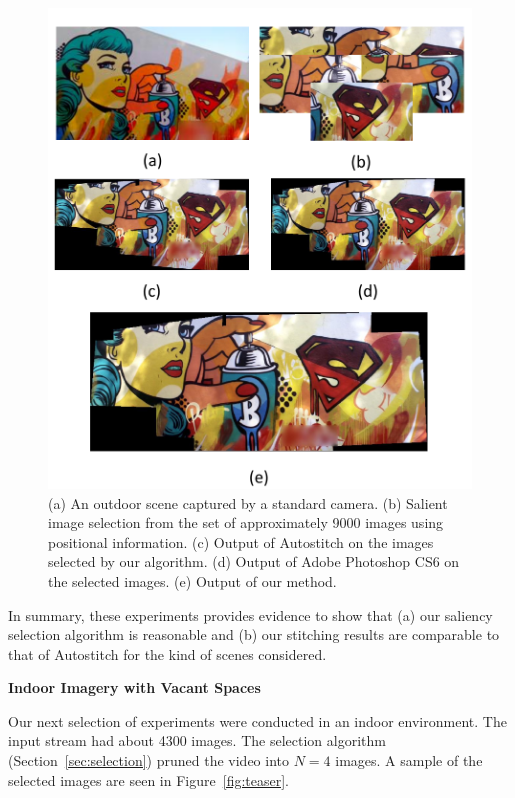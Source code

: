 \documentclass[11pt]{article}
\begin{document}
\begin{figure}[h!]
\centering
\includegraphics[width=0.87\linewidth]{mosaicing/results/sac1}
\caption{ (a) An outdoor scene captured by a standard camera.  (b) Salient image selection from the set of
  approximately 9000 images using positional information. (c) Output of
  Autostitch \cite{autostitch} on the images selected by our algorithm. (d) Output of Adobe Photoshop CS6
  \cite{photoshop} on the selected images. (e) Output of our method.}
\label{fig:validResults}
\end{figure}

In summary, these experiments provides evidence to show that (a) our
saliency selection algorithm is reasonable and (b) our stitching
results are comparable to that of Autostitch for the kind of scenes
considered.

\noindent\textbf{Indoor Imagery with Vacant Spaces}

Our next selection of experiments were conducted in an indoor
environment.  The input stream had about 4300 images. The selection algorithm
(Section~\ref{sec:selection}) pruned the video into $N=4$ images.
A sample of the selected images are seen in Figure~\ref{fig:teaser}.
\end{document}
